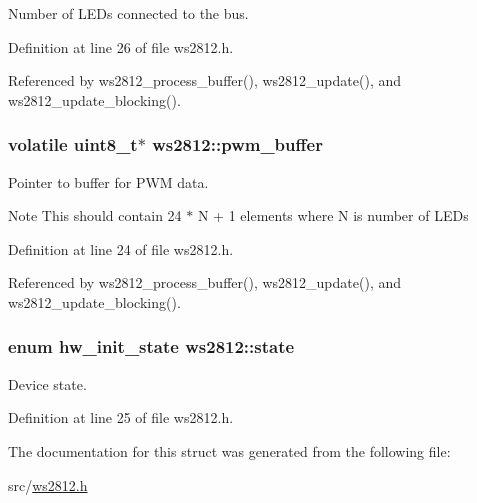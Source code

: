 Number of L\+E\+Ds connected to the bus. 



Definition at line 26 of file ws2812.\+h.



Referenced by ws2812\+\_\+process\+\_\+buffer(), ws2812\+\_\+update(), and ws2812\+\_\+update\+\_\+blocking().

\hypertarget{structws2812_a864f88183104cfbdd144cb301870e655}{}
\subsubsection[{pwm\+\_\+buffer}]{\setlength{\rightskip}{0pt plus 5cm}volatile uint8\+\_\+t$\ast$ ws2812\+::pwm\+\_\+buffer}\label{structws2812_a864f88183104cfbdd144cb301870e655}


Pointer to buffer for P\+W\+M data. 

\begin{DoxyNote}{Note}
This should contain 24 $\ast$ N + 1 elements where N is number of L\+E\+Ds 
\end{DoxyNote}


Definition at line 24 of file ws2812.\+h.



Referenced by ws2812\+\_\+process\+\_\+buffer(), ws2812\+\_\+update(), and ws2812\+\_\+update\+\_\+blocking().

\hypertarget{structws2812_a396b295c928e75adc5688c49c832e631}{}
\subsubsection[{state}]{\setlength{\rightskip}{0pt plus 5cm}enum {\bf hw\+\_\+init\+\_\+state} ws2812\+::state}\label{structws2812_a396b295c928e75adc5688c49c832e631}


Device state. 



Definition at line 25 of file ws2812.\+h.



The documentation for this struct was generated from the following file\+:\begin{DoxyCompactItemize}
\item 
src/\hyperlink{ws2812_8h}{ws2812.\+h}\end{DoxyCompactItemize}
